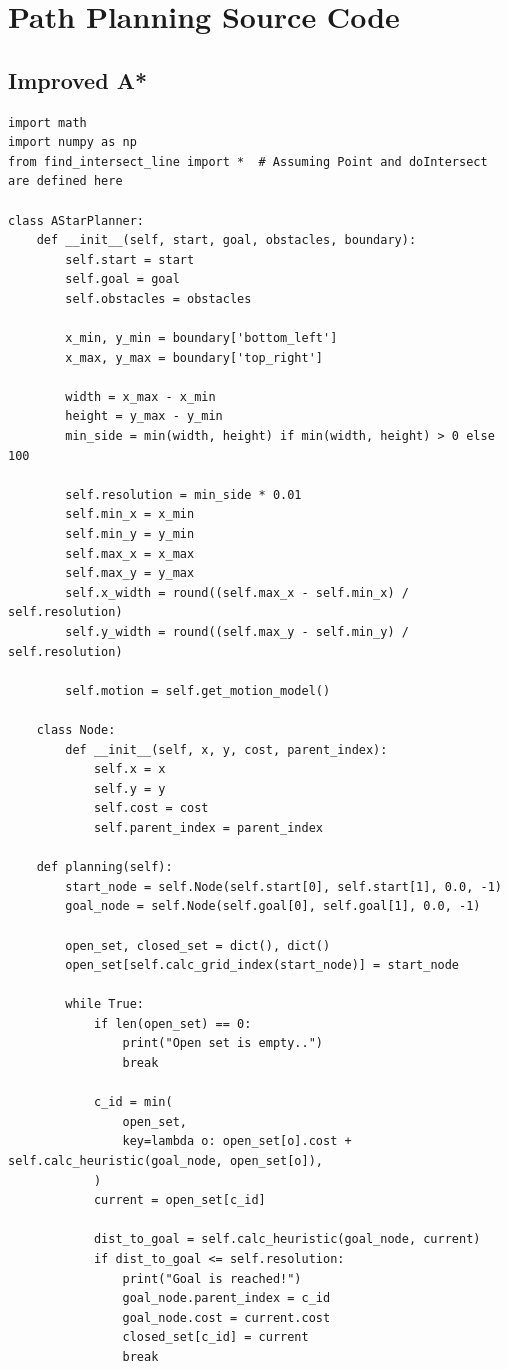 \chapter{Path Planning Source Code}

\section{Improved A*}
\begin{lstlisting}
import math
import numpy as np
from find_intersect_line import *  # Assuming Point and doIntersect are defined here

class AStarPlanner:
    def __init__(self, start, goal, obstacles, boundary):
        self.start = start
        self.goal = goal
        self.obstacles = obstacles
        
        x_min, y_min = boundary['bottom_left']
        x_max, y_max = boundary['top_right']

        width = x_max - x_min
        height = y_max - y_min
        min_side = min(width, height) if min(width, height) > 0 else 100
        
        self.resolution = min_side * 0.01
        self.min_x = x_min
        self.min_y = y_min
        self.max_x = x_max
        self.max_y = y_max
        self.x_width = round((self.max_x - self.min_x) / self.resolution)
        self.y_width = round((self.max_y - self.min_y) / self.resolution)
        
        self.motion = self.get_motion_model()

    class Node:
        def __init__(self, x, y, cost, parent_index):
            self.x = x
            self.y = y
            self.cost = cost
            self.parent_index = parent_index

    def planning(self):
        start_node = self.Node(self.start[0], self.start[1], 0.0, -1)
        goal_node = self.Node(self.goal[0], self.goal[1], 0.0, -1)

        open_set, closed_set = dict(), dict()
        open_set[self.calc_grid_index(start_node)] = start_node

        while True:
            if len(open_set) == 0:
                print("Open set is empty..")
                break

            c_id = min(
                open_set,
                key=lambda o: open_set[o].cost + self.calc_heuristic(goal_node, open_set[o]),
            )
            current = open_set[c_id]

            dist_to_goal = self.calc_heuristic(goal_node, current)
            if dist_to_goal <= self.resolution:
                print("Goal is reached!")
                goal_node.parent_index = c_id
                goal_node.cost = current.cost
                closed_set[c_id] = current
                break


\end{lstlisting}
